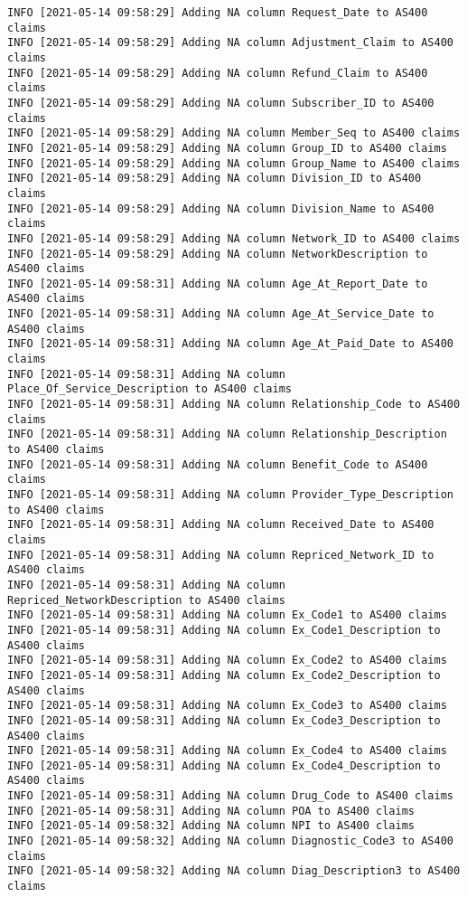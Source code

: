 \documentclass[
]{book}
\begin{document}
\begin{verbatim}
INFO [2021-05-14 09:58:29] Adding NA column Request_Date to AS400 claims
INFO [2021-05-14 09:58:29] Adding NA column Adjustment_Claim to AS400 claims
INFO [2021-05-14 09:58:29] Adding NA column Refund_Claim to AS400 claims
INFO [2021-05-14 09:58:29] Adding NA column Subscriber_ID to AS400 claims
INFO [2021-05-14 09:58:29] Adding NA column Member_Seq to AS400 claims
INFO [2021-05-14 09:58:29] Adding NA column Group_ID to AS400 claims
INFO [2021-05-14 09:58:29] Adding NA column Group_Name to AS400 claims
INFO [2021-05-14 09:58:29] Adding NA column Division_ID to AS400 claims
INFO [2021-05-14 09:58:29] Adding NA column Division_Name to AS400 claims
INFO [2021-05-14 09:58:29] Adding NA column Network_ID to AS400 claims
INFO [2021-05-14 09:58:29] Adding NA column NetworkDescription to AS400 claims
INFO [2021-05-14 09:58:31] Adding NA column Age_At_Report_Date to AS400 claims
INFO [2021-05-14 09:58:31] Adding NA column Age_At_Service_Date to AS400 claims
INFO [2021-05-14 09:58:31] Adding NA column Age_At_Paid_Date to AS400 claims
INFO [2021-05-14 09:58:31] Adding NA column Place_Of_Service_Description to AS400 claims
INFO [2021-05-14 09:58:31] Adding NA column Relationship_Code to AS400 claims
INFO [2021-05-14 09:58:31] Adding NA column Relationship_Description to AS400 claims
INFO [2021-05-14 09:58:31] Adding NA column Benefit_Code to AS400 claims
INFO [2021-05-14 09:58:31] Adding NA column Provider_Type_Description to AS400 claims
INFO [2021-05-14 09:58:31] Adding NA column Received_Date to AS400 claims
INFO [2021-05-14 09:58:31] Adding NA column Repriced_Network_ID to AS400 claims
INFO [2021-05-14 09:58:31] Adding NA column Repriced_NetworkDescription to AS400 claims
INFO [2021-05-14 09:58:31] Adding NA column Ex_Code1 to AS400 claims
INFO [2021-05-14 09:58:31] Adding NA column Ex_Code1_Description to AS400 claims
INFO [2021-05-14 09:58:31] Adding NA column Ex_Code2 to AS400 claims
INFO [2021-05-14 09:58:31] Adding NA column Ex_Code2_Description to AS400 claims
INFO [2021-05-14 09:58:31] Adding NA column Ex_Code3 to AS400 claims
INFO [2021-05-14 09:58:31] Adding NA column Ex_Code3_Description to AS400 claims
INFO [2021-05-14 09:58:31] Adding NA column Ex_Code4 to AS400 claims
INFO [2021-05-14 09:58:31] Adding NA column Ex_Code4_Description to AS400 claims
INFO [2021-05-14 09:58:31] Adding NA column Drug_Code to AS400 claims
INFO [2021-05-14 09:58:31] Adding NA column POA to AS400 claims
INFO [2021-05-14 09:58:32] Adding NA column NPI to AS400 claims
INFO [2021-05-14 09:58:32] Adding NA column Diagnostic_Code3 to AS400 claims
INFO [2021-05-14 09:58:32] Adding NA column Diag_Description3 to AS400 claims

\end{verbatim}
\end{document}

